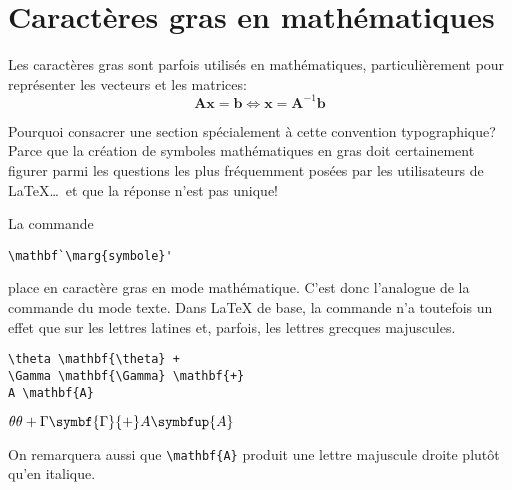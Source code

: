 

\section{Caractères gras en mathématiques}
\label{sec:math:gras}

Les caractères gras sont parfois utilisés en mathématiques,
particulièrement pour représenter les vecteurs et les matrices:
\begin{equation*}
  \symbf{A} \symbf{x} = \symbf{b} \Leftrightarrow
  \symbf{x} = \symbf{A}^{-1} \symbf{b}
\end{equation*}

Pourquoi consacrer une section spécialement à cette convention
typographique? Parce que la création de symboles mathématiques en
gras doit certainement figurer parmi les questions les plus
fréquemment posées par les utilisateurs de {\LaTeX}\dots\ et que la
réponse n'est pas unique!

La commande
\begin{lstlisting}
\mathbf`\marg{symbole}'
\end{lstlisting}
place  en caractère gras en mode mathématique. C'est
donc l'analogue de la commande \cmd{\textbf} du mode texte. Dans
{\LaTeX} de base, la commande n'a toutefois un effet que sur les
lettres latines et, parfois, les lettres grecques majuscules.
\begin{demo}
  \begin{texample}[0.6\linewidth]
\begin{lstlisting}
\theta \mathbf{\theta} +
\Gamma \mathbf{\Gamma} \mathbf{+}
A \mathbf{A}
\end{lstlisting}
    \producing
    $\theta {\theta} + \Gamma \symbf{\Gamma} {+} A \symbfup{A}$
  \end{texample}
\end{demo}
On remarquera aussi que \verb=\mathbf{A}= produit une lettre
majuscule droite plutôt qu'en italique.

